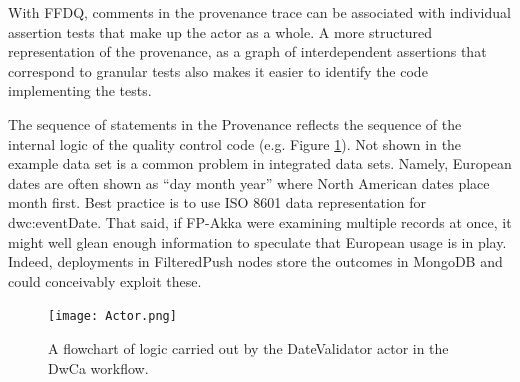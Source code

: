 \documentclass{article}
\begin{document}
With FFDQ, comments in the provenance trace can be associated with individual assertion tests that make up the actor as a whole. A more structured representation of the provenance, as a graph of interdependent assertions that correspond to granular tests also makes it easier to identify the code implementing the tests.

The sequence of statements in the Provenance reflects the sequence of the internal logic of the quality control code (e.g. Figure \ref{fig:actorlogic}).
Not shown in the example data set is a common problem in integrated data sets. Namely, European dates are often shown as ``day month year'' where North American dates place month first. Best practice is to use ISO 8601 data representation \citep{iso_iso_2004} for dwc:eventDate. 
That said, if FP-Akka were examining multiple records at once, it might well glean enough information to speculate that European usage is in play.  Indeed, deployments in FilteredPush nodes store the outcomes in MongoDB  and could conceivably exploit these.  

\begin{figure}[p]
\texttt{[image: Actor.png]}
\caption{A flowchart of logic carried out by the DateValidator actor in the DwCa workflow.}
\label{fig:actorlogic}
\end{figure}
\end{document}
